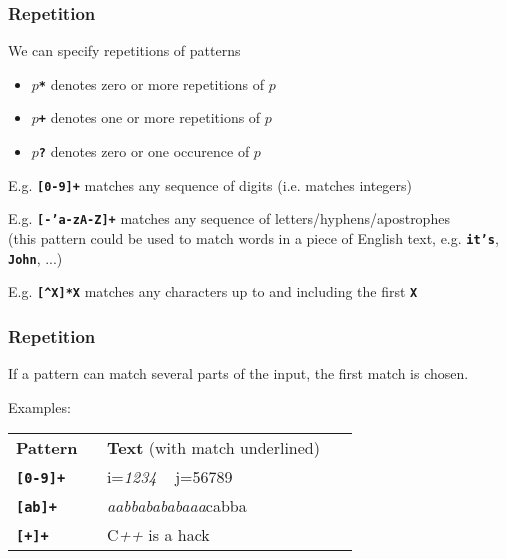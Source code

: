\begin{frame}
\frametitle{Repetition}
We can specify repetitions of patterns
\begin{itemize}
\item  $p${\bf{\textbf{\tt{*}}}} denotes zero or more repetitions of $p$
\item  $p${\bf{\textbf{\tt{+}}}} denotes one or more repetitions of $p$
\item  $p${\bf{\textbf{\tt{?}}}} denotes zero or one occurence of $p$
\end{itemize}
E.g. \textbf{\tt{[0-9]+}} matches any sequence of digits (i.e. matches integers)

E.g. \textbf{\tt{[-'a-zA-Z]+}} matches any sequence of letters/hyphens/apostrophes \\
{\small (this pattern could be used to match words in a piece of English text, e.g. \textbf{\tt{it's}}, \textbf{\tt{John}}, ...)}

E.g. \textbf{\tt{[{\textasciicircum}X]*X}} matches any characters up to and including the first \textbf{\tt{X}}
\end{frame}

\begin{frame}[shrink]
\frametitle{Repetition}
If a pattern can match several parts of the input,
the first match is chosen.

Examples:

\begin{center}
\begin{tabular}{lll}

  \begin{minipage}{5cm}{\bf{Pattern}} ~\end{minipage}
   & \begin{minipage}{18cm}{\bf{Text}} (with match underlined)~\end{minipage}
\\[1ex]

  \begin{minipage}{5cm}\textbf{\tt{[0-9]+}}~\end{minipage}
   & \begin{minipage}{18cm}i={\em{1234}} ~ j=56789~\end{minipage}
\\[1ex]

  \begin{minipage}{5cm}\textbf{\tt{[ab]+}}~\end{minipage}
   & \begin{minipage}{18cm}{\em{aabbabababaaa}}cabba~\end{minipage}
\\[1ex]

  \begin{minipage}{5cm}\textbf{\tt{[+]+}}~\end{minipage}
   & \begin{minipage}{18cm}C{\em{++}} is a hack~\end{minipage}
\\[1ex]
\end{tabular}
\end{center}

\end{frame}

